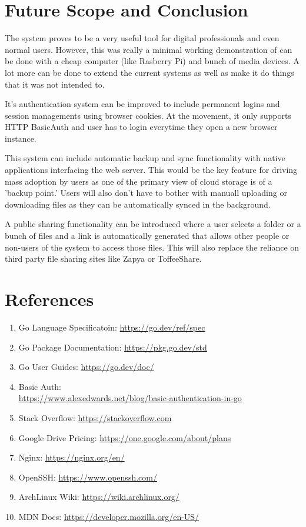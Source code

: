 \documentclass[12pt]{article}
\makeatletter
\let\inserttitle\@title
\makeatother
\begin{document}
\section{Future Scope and Conclusion}
\vspace{2cm}
\quad\quad
The \inserttitle{} system proves to be a very useful tool for digital professionals and even normal users. However, this was really a minimal working demonstration of can be done with a cheap computer (like Rasberry Pi) and bunch of media devices. A lot more can be done to extend the current systems as well as make it do things that it was not intended to. \\
\par
It's authentication system can be improved to include permanent logins and session managements using browser cookies. At the movement, it only supports HTTP BasicAuth and user has to login everytime they open a new browser instance. \\
\par
This system can include automatic backup and sync functionality with native applications interfacing the web server. This would be the key feature for driving mass adoption by users as one of the primary view of cloud storage is of a 'backup point.' Users will also don't have to bother with manuall uploading or downloading files as they can be automatically synced in the background. \\
\par
A public sharing functionality can be introduced where a user selects a folder or a bunch of files and a link is automatically generated that allows other people or non-users of the system to access those files. This will also replace the reliance on third party file sharing sites like Zapya or ToffeeShare.


\section{References}
\vspace{2cm}
\begin{enumerate}
	\item Go Language Specificatoin: \quad \url{https://go.dev/ref/spec}
	\item Go Package Documentation: \quad \url{https://pkg.go.dev/std}
	\item Go User Guides: \quad \url{https://go.dev/doc/}
	\item Basic Auth: \\ \quad \url{https://www.alexedwards.net/blog/basic-authentication-in-go}
	\item Stack Overflow: \quad \url{https://stackoverflow.com}
	\item Google Drive Pricing: \quad \url{https://one.google.com/about/plans}
	\item Nginx: \quad \url{https://nginx.org/en/}
	\item OpenSSH: \quad \url{https://www.openssh.com/}
	\item ArchLinux Wiki: \quad \url{https://wiki.archlinux.org/}
	\item MDN Docs: \quad \url{https://developer.mozilla.org/en-US/}
\end{enumerate}


\fi  %
\end{document}
